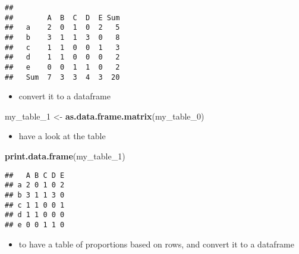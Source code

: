 \documentclass[]{article}
\newenvironment{Shaded}{\begin{snugshade}}{\end{snugshade}}
\newcommand{\DataTypeTok}[1]{\textcolor[rgb]{0.13,0.29,0.53}{#1}}
\newcommand{\DecValTok}[1]{\textcolor[rgb]{0.00,0.00,0.81}{#1}}
\newcommand{\KeywordTok}[1]{\textcolor[rgb]{0.13,0.29,0.53}{\textbf{#1}}}
\newcommand{\NormalTok}[1]{#1}
\newcommand{\OperatorTok}[1]{\textcolor[rgb]{0.81,0.36,0.00}{\textbf{#1}}}
\newcommand{\StringTok}[1]{\textcolor[rgb]{0.31,0.60,0.02}{#1}}
\providecommand{\tightlist}{%
  \setlength{\itemsep}{0pt}\setlength{\parskip}{0pt}}
\begin{document}
\begin{verbatim}
##      
##        A  B  C  D  E Sum
##   a    2  0  1  0  2   5
##   b    3  1  1  3  0   8
##   c    1  1  0  0  1   3
##   d    1  1  0  0  0   2
##   e    0  0  1  1  0   2
##   Sum  7  3  3  4  3  20
\end{verbatim}

\begin{itemize}
\tightlist
\item
  convert it to a dataframe
\end{itemize}

\begin{Shaded}
\begin{Highlighting}[]
\NormalTok{my_table_}\DecValTok{1}\NormalTok{ <-}\StringTok{ }\KeywordTok{as.data.frame.matrix}\NormalTok{(my_table_}\DecValTok{0}\NormalTok{)}
\end{Highlighting}
\end{Shaded}

\begin{itemize}
\tightlist
\item
  have a look at the table
\end{itemize}

\begin{Shaded}
\begin{Highlighting}[]
\KeywordTok{print.data.frame}\NormalTok{(my_table_}\DecValTok{1}\NormalTok{)}
\end{Highlighting}
\end{Shaded}

\begin{verbatim}
##   A B C D E
## a 2 0 1 0 2
## b 3 1 1 3 0
## c 1 1 0 0 1
## d 1 1 0 0 0
## e 0 0 1 1 0
\end{verbatim}

\begin{itemize}
\tightlist
\item
  to have a table of proportions based on rows, and convert it to a
  dataframe
\end{itemize}

\begin{Shaded}
\end{Shaded}
\end{document}
